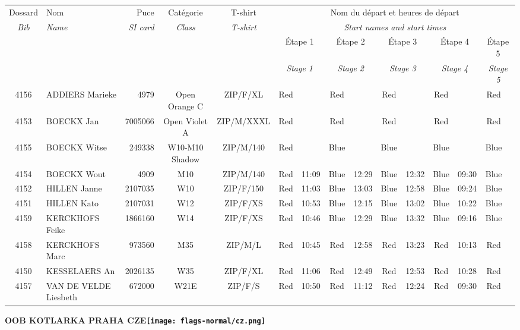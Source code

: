 \documentclass{report}
\begin{document}
  \begin{longtable}{|c|l|r|c|c|*{5}{cc|}}
    Dossard & Nom  & Puce    & Catégorie & T-shirt & \multicolumn{10}{c|}{Nom du départ et heures de départ} \\
    \itshape Bib     & \itshape Name & \itshape SI card & \itshape Class  & \itshape  T-shirt  & \multicolumn{10}{c|}{\itshape Start names and start times} \\
    \hline
    & & & & & \multicolumn{2}{c|}{Étape 1} & \multicolumn{2}{c|}{Étape 2} & \multicolumn{2}{c|}{Étape 3} & \multicolumn{2}{c|}{Étape 4} & \multicolumn{2}{c|}{Étape 5} \\
    & & & & & \multicolumn{2}{c|}{\itshape Stage 1} & \multicolumn{2}{c|}{\itshape Stage 2} & \multicolumn{2}{c|}{\itshape Stage 3} & \multicolumn{2}{c|}{\itshape Stage 4} & \multicolumn{2}{c|}{\itshape Stage 5} \\
    \hline
    4156 & ADDIERS Marieke & 4979 & Open Orange C & ZIP/F/XL & Red &   & Red &   & Red &   & Red &   & Red &  \\
    4153 & BOECKX Jan & 7005066 & Open Violet A & ZIP/M/XXXL & Red &   & Red &   & Red &   & Red &   & Red &  \\
    4155 & BOECKX Witse & 249338 & W10-M10 Shadow & ZIP/M/140 & Red &   & Blue &   & Blue &   & Blue &   & Blue &  \\
    4154 & BOECKX Wout & 4909 & M10 & ZIP/M/140 & Red & 11:09 & Blue & 12:29 & Blue & 12:32 & Blue & 09:30 & Blue &  \\
    4152 & HILLEN Janne & 2107035 & W10 & ZIP/F/150 & Red & 11:03 & Blue & 13:03 & Blue & 12:58 & Blue & 09:24 & Blue &  \\
    4151 & HILLEN Kato & 2107031 & W12 & ZIP/F/XS & Red & 10:53 & Blue & 12:15 & Blue & 13:02 & Blue & 10:22 & Blue &  \\
    4159 & KERCKHOFS Feike & 1866160 & W14 & ZIP/F/XS & Red & 10:46 & Blue & 12:29 & Blue & 13:32 & Blue & 09:16 & Blue &  \\
    4158 & KERCKHOFS Marc & 973560 & M35 & ZIP/M/L & Red & 10:45 & Red & 12:58 & Red & 13:23 & Red & 10:13 & Red &  \\
    4150 & KESSELAERS An & 2026135 & W35 & ZIP/F/XL & Red & 11:06 & Red & 12:49 & Red & 12:53 & Red & 10:28 & Red &  \\
    4157 & VAN DE VELDE Liesbeth & 672000 & W21E & ZIP/F/S & Red & 10:50 & Red & 11:12 & Red & 12:24 & Red & 09:30 & Red &  \\
  \end{longtable}
\newpage
  \Huge \centering \bfseries OOB KOTLARKA PRAHA  CZE\normalfont \footnotesize \sffamily \hfill \texttt{[image: flags-normal/cz.png]} \newline 
\end{document}
